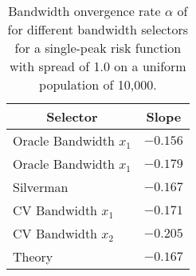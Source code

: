 \begin{table}[htbp]
\begin{center}
\begin{tabular}{lr}
\hline\hline
\multicolumn{1}{c}{Selector}&\multicolumn{1}{c}{Slope}\tabularnewline
\hline
Oracle Bandwidth $x_1$&$-0.156$\tabularnewline
Oracle Bandwidth $x_1$&$-0.179$\tabularnewline
Silverman&$-0.167$\tabularnewline
CV Bandwidth $x_1$&$-0.171$\tabularnewline
CV Bandwidth $x_2$&$-0.205$\tabularnewline
Theory&$-0.167$\tabularnewline
\hline
\end{tabular}
\caption[Bandwidth convergence rate of bandwidth selectors]{Bandwidth onvergence rate $\alpha$ of for different bandwidth selectors for a single-peak risk function with spread of 1.0 on a uniform population of 10,000.\label{tab:results:bandwidth_alpha_by_selector}}\end{center}
\end{table}
